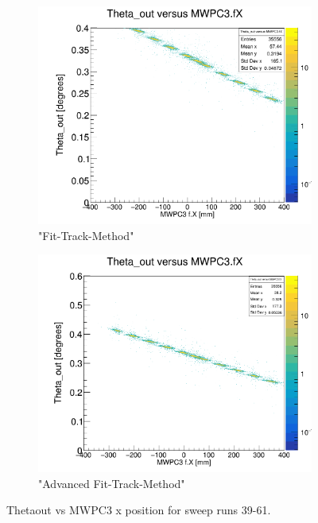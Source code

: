\documentclass[12pt, letterpaper]{article}
\begin{document}
\begin{figure}[!htbp]
\begin{subfigure}{.5\textwidth}
  \label{fig:sub-second}
\end{subfigure}
\begin{subfigure}{.5\textwidth}
  \centering
  \includegraphics[width=.9\linewidth]{plot_imgs/theta_out_mw3_fit.png} 
  \caption{"Fit-Track-Method"}
  \label{fig:sub-second}
\end{subfigure}
\begin{subfigure}{.5\textwidth}
  \centering
  \includegraphics[width=.9\linewidth]{plot_imgs/theta_out_mw3_last.png} 
  \caption{"Advanced Fit-Track-Method"}
  \label{fig:sub-second}
\end{subfigure}
\caption{Theta\textunderscore out vs MWPC3 x position for sweep runs 39-61.}
\label{fig:fig}
\end{figure}
\FloatBarrier
\clearpage
\end{document}
